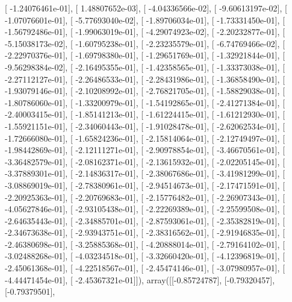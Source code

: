 \documentclass{article}
\begin{document}
       [ -1.24076461e-01],
       [  1.48807652e-03],
       [ -4.04336566e-02],
       [ -9.60613197e-02],
       [ -1.07076601e-01],
       [ -5.77693040e-02],
       [ -1.89706034e-01],
       [ -1.73331450e-01],
       [ -1.56792486e-01],
       [ -1.99063019e-01],
       [ -4.29074923e-02],
       [ -2.20232877e-01],
       [ -5.15038173e-02],
       [ -1.60795238e-01],
       [ -2.23235579e-01],
       [ -6.74769466e-02],
       [ -2.22970376e-01],
       [ -1.69798380e-01],
       [ -1.29651769e-01],
       [ -1.32921844e-01],
       [ -9.56298384e-02],
       [ -2.16495355e-01],
       [ -1.42358565e-01],
       [ -1.33373038e-01],
       [ -2.27112127e-01],
       [ -2.26486533e-01],
       [ -2.28431986e-01],
       [ -1.36858490e-01],
       [ -1.93079146e-01],
       [ -2.10208992e-01],
       [ -2.76821705e-01],
       [ -1.58829038e-01],
       [ -1.80786060e-01],
       [ -1.33200979e-01],
       [ -1.54192865e-01],
       [ -2.41271384e-01],
       [ -2.40003415e-01],
       [ -1.85141213e-01],
       [ -1.61224415e-01],
       [ -1.61212930e-01],
       [ -1.55921151e-01],
       [ -2.34060443e-01],
       [ -1.91028478e-01],
       [ -2.62062534e-01],
       [ -1.72666080e-01],
       [ -1.65824236e-01],
       [ -2.15814064e-01],
       [ -2.12749497e-01],
       [ -1.98442869e-01],
       [ -2.12111271e-01],
       [ -2.90978854e-01],
       [ -3.46670561e-01],
       [ -3.36482579e-01],
       [ -2.08162371e-01],
       [ -2.13615932e-01],
       [ -2.02205145e-01],
       [ -3.37889301e-01],
       [ -2.14836317e-01],
       [ -2.38067686e-01],
       [ -3.41981299e-01],
       [ -3.08869019e-01],
       [ -2.78380961e-01],
       [ -2.94514673e-01],
       [ -2.17471591e-01],
       [ -2.20925363e-01],
       [ -2.20769683e-01],
       [ -2.15776482e-01],
       [ -2.26907343e-01],
       [ -4.05627846e-01],
       [ -2.93105438e-01],
       [ -2.22269389e-01],
       [ -2.25599508e-01],
       [ -2.64635443e-01],
       [ -2.34885701e-01],
       [ -2.87593061e-01],
       [ -2.35382819e-01],
       [ -2.34673638e-01],
       [ -2.93943751e-01],
       [ -2.38316562e-01],
       [ -2.91946835e-01],
       [ -2.46380698e-01],
       [ -3.25885368e-01],
       [ -4.20888014e-01],
       [ -2.79164102e-01],
       [ -3.02488268e-01],
       [ -4.03234518e-01],
       [ -3.32660420e-01],
       [ -4.12396819e-01],
       [ -2.45061368e-01],
       [ -4.22518567e-01],
       [ -2.45474146e-01],
       [ -3.07980957e-01],
       [ -4.44471454e-01],
       [ -2.45367321e-01]]), array([[-0.85724787],
       [-0.79320457],
       [-0.79379501],
\end{document}
